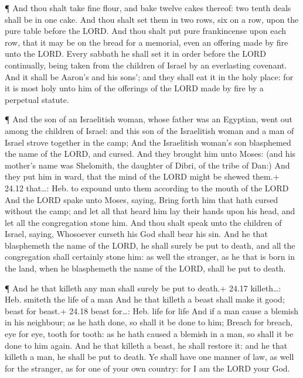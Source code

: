  ¶ And thou shalt take fine flour, and bake twelve cakes
thereof: two tenth deals shall be in one cake.  And thou
shalt set them in two rows, six on a row, upon the pure table before the
LORD.  And thou shalt put pure frankincense upon each row,
that it may be on the bread for a memorial, even an offering made by
fire unto the LORD.  Every sabbath he shall set it in order
before the LORD continually, being taken from the children of Israel by
an everlasting covenant.  And it shall be Aaron's and his
sons'; and they shall eat it in the holy place: for it is most holy unto
him of the offerings of the LORD made by fire by a perpetual statute.

 ¶ And the son of an Israelitish woman, whose father was an
Egyptian, went out among the children of Israel: and this son of the
Israelitish woman and a man of Israel strove together in the camp;
 And the Israelitish woman's son blasphemed the name of the
LORD, and cursed. And they brought him unto Moses: (and his mother's
name was Shelomith, the daughter of Dibri, of the tribe of Dan:)
 And they put him in ward, that the mind of the LORD might
be shewed them.+ 24.12 that\ldots: Heb. to expound unto them according
to the mouth of the LORD  And the LORD spake unto Moses,
saying,  Bring forth him that hath cursed without the camp;
and let all that heard him lay their hands upon his head, and let all
the congregation stone him.  And thou shalt speak unto the
children of Israel, saying, Whosoever curseth his God shall bear his
sin.  And he that blasphemeth the name of the LORD, he
shall surely be put to death, and all the congregation shall certainly
stone him: as well the stranger, as he that is born in the land, when he
blasphemeth the name of the LORD, shall be put to death.

 ¶ And he that killeth any man shall surely be put to
death.+ 24.17 killeth\ldots: Heb. smiteth the life of a man
 And he that killeth a beast shall make it good; beast for
beast.+ 24.18 beast for\ldots: Heb. life for life  And if a
man cause a blemish in his neighbour; as he hath done, so shall it be
done to him;  Breach for breach, eye for eye, tooth for
tooth: as he hath caused a blemish in a man, so shall it be done to him
again.  And he that killeth a beast, he shall restore it:
and he that killeth a man, he shall be put to death.  Ye
shall have one manner of law, as well for the stranger, as for one of
your own country: for I am the LORD your God.

